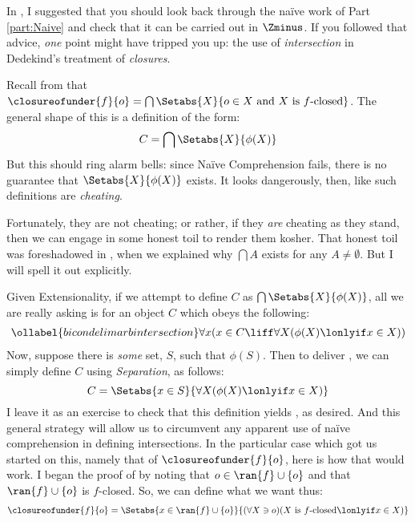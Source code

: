 \documentclass[../../../include/open-logic-section]{subfiles}
\begin{document}
In , I suggested that you should look back through the na\"ive work of Part \ref{part:Naive} and check that it can be carried out in $\Zminus$. If you followed that advice, \emph{one} point might have tripped you up: the use of \emph{intersection} in Dedekind's treatment of \emph{closures}. 

Recall from  that $\closureofunder{f}{o} = \bigcap\Setabs{X}{o \in X \text{ and }X\text{ is }f\text{-closed}}$. The general shape of this is a definition of the form:
$$C = \bigcap\Setabs{X}{\phi(X)}$$
But this should ring alarm bells: since Na\"ive Comprehension fails, there is no guarantee that $\Setabs{X}{\phi(X)}$ exists. It looks dangerously, then, like such definitions are \emph{cheating}. 

Fortunately, they are not cheating; or rather, if they \emph{are} cheating as they stand, then we can engage in some honest toil to render them kosher. That honest toil was foreshadowed in , when we explained why $\bigcap A$ exists for any $A \neq \emptyset$. But I will spell it out explicitly.

Given Extensionality, if we attempt to define $C$ as $\bigcap\Setabs{X}{\phi(X)}$, all we are really asking is for an object $C$ which obeys the following:
\begin{align}\ollabel{bicondelimarbintersection}
	\forall x(x \in C \liff \forall X(\phi(X) \lonlyif x \in X))
\end{align}
Now, suppose there is \emph{some} set, $S$, such that $\phi(S)$. Then to deliver , we can simply define $C$ using \emph{Separation}, as follows:
$$C = \Setabs{x \in S}{\forall X(\phi(X) \lonlyif x \in X)}$$
I leave it as an exercise to check that this definition yields , as desired. %
And this general strategy will allow us to circumvent any apparent use of na\"ive comprehension in defining intersections. In the particular case which got us started on this, namely that of $\closureofunder{f}{o}$, here is how that would work. I began the proof of  by noting that $o \in \ran{f}\cup\{o\}$ and that $\ran{f} \cup \{o\}$ is $f$-closed. So, we can define what we want thus:
\begin{align*}
	\closureofunder{f}{o} = \Setabs{x \in \ran{f}\cup\{o\}}{(\forall X \ni o)(X\text{ is }f\text{-closed} \lonlyif x \in X)}
\end{align*}
\end{document}
